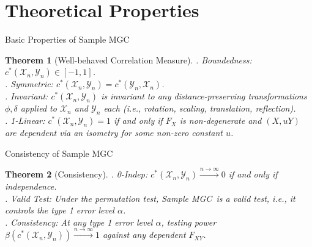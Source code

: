 \documentclass[mathserif,t]{beamer}
\newtheorem{thm}{Theorem}
\newcommand{\Mgc}{MGC}
\newcommand{\mbx}{X}
\newcommand{\mby}{Y}
\begin{document}





\section{Theoretical Properties}
\begin{frame}{Basic Properties of Sample \Mgc}
\begin{thm}[Well-behaved Correlation Measure]
. Boundedness: $c^{*}(\mathcal{X}_{n},\mathcal{Y}_{n}) \in [-1,1]$.\\
\pause
{}. Symmetric: $c^{*}(\mathcal{X}_{n},\mathcal{Y}_{n}) =c^{*}(\mathcal{Y}_{n},\mathcal{X}_{n})$.\\
\pause
{}. Invariant: $c^{*}(\mathcal{X}_{n},\mathcal{Y}_{n})$ is invariant to any distance-preserving transformations $\phi,\delta$ applied to $\mathcal{X}_{n}$ and $\mathcal{Y}_{n}$ each (i.e., rotation, scaling, translation, reflection).\\
\pause
{}. 1-Linear: $c^{*}(\mathcal{X}_{n},\mathcal{Y}_{n})=1$ if and only if $F_{X}$ is non-degenerate and $(X, u Y)$ are dependent via an isometry for some non-zero constant $u$.\\
\end{thm}
\end{frame}

\begin{frame}{Consistency of Sample \Mgc}
\begin{thm}[Consistency]
. 0-Indep: $c^{*}(\mathcal{X}_{n},\mathcal{Y}_{n}) \stackrel{n \rightarrow \infty}{\rightarrow}0$ if and only if independence.\\
\pause
{}. Valid Test: Under the permutation test, Sample \Mgc~is a valid test, i.e., it controls the type 1 error level $\alpha$.\\
\pause
{}. Consistency: At any type 1 error level $\alpha$, testing power $\beta(c^{*}(\mathcal{X}_{n},\mathcal{Y}_{n})) \stackrel{n \rightarrow \infty}{\rightarrow} 1$ against any dependent $F_{\mbx \mby}$.\\
\end{thm}
\end{frame}
\end{document}
